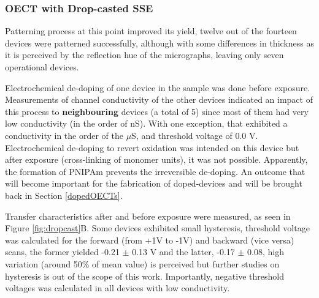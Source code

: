 
\subsubsection{OECT with Drop-casted SSE}%
Patterning process at this point improved its yield, twelve out of the fourteen devices were patterned successfully, although with some differences in thickness as it is perceived by the reflection hue of the micrographs, leaving only seven operational devices. %

Electrochemical de-doping of one device in the sample was done before exposure. Measurements of channel conductivity of the other devices indicated an impact of this process to \textbf{neighbouring} devices (a total of 5) since most of them had very low conductivity (in the order of nS). With one exception, that exhibited a conductivity in the order of the $\mu$S, and threshold voltage of 0.0 V. Electrochemical de-doping to revert oxidation was intended on this device but after exposure (cross-linking of monomer units), it was not possible. Apparently, the formation of PNIPAm prevents the irreversible de-doping. An outcome that will become important for the fabrication of doped-devices and will be brought back in Section \ref{dopedOECTs}.

Transfer characteristics after and before exposure were measured, as seen in Figure \ref{fig:dropcast}B. Some devices exhibited small hysteresis, threshold voltage was calculated for the forward (from +1V to -1V) and backward (vice versa) scans, the former yielded -0.21 $\pm$ 0.13 V and the latter, -0.17 $\pm$ 0.08, high variation (around 50\% of mean value) is perceived but further studies on hysteresis is out of the scope of this work. Importantly, negative threshold voltages was calculated in all devices with low conductivity.

